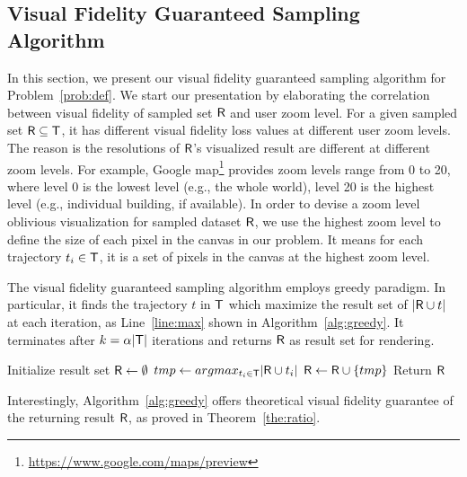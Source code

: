 \subsection{Visual Fidelity Guaranteed Sampling Algorithm}\label{sec:greedy}
In this section, we present our visual fidelity guaranteed sampling algorithm for Problem~\ref{prob:def}.
We start our presentation by elaborating the correlation between visual fidelity of sampled set $\mathsf{R}$ and user zoom level.
For a given sampled set $\mathsf{R} \subseteq \mathsf{T}$, it has different visual fidelity loss values at different user zoom levels.
The reason is the resolutions of $\mathsf{R}$'s visualized result are different at different zoom levels.
For example, Google map\footnote{\url{https://www.google.com/maps/preview}} provides zoom levels range from 0 to 20,
where level 0 is the lowest level (e.g., the whole world), level 20 is the highest level (e.g., individual building, if available).
In order to devise a zoom level oblivious visualization for sampled dataset $\mathsf{R}$,
we use the highest zoom level to define the size of each pixel in the canvas in our problem.
It means for each trajectory $t_i \in \mathsf{T}$, it is a set of pixels in the canvas at the highest zoom level.

The visual fidelity guaranteed sampling algorithm employs greedy paradigm.
In particular, it finds the trajectory $t$ in $\mathsf{T}$ which maximize the result set of $|\mathsf{R} \cup t|$ at each iteration, as Line~\ref{line:max} shown in Algorithm~\ref{alg:greedy}.
It terminates after $k=\alpha |\mathsf{T}|$ iterations and returns $\mathsf{R}$ as result set for rendering.

\begin{algorithm}
    \caption{$\vats(\D,k=\alpha |\D|)$} \label{alg:greedy}
    \begin{algorithmic}[1]
    \State Initialize result set $\mathsf{R} \leftarrow \emptyset$
        \State $tmp \leftarrow argmax_{t_i \in \mathsf{T}} |\mathsf{R} \cup t_i|$ \label{line:max}
        \State $\mathsf{R} \leftarrow \mathsf{R} \cup \{ tmp \}$
    \EndWhile
    \State Return $\mathsf{R}$
    \end{algorithmic}
\end{algorithm}

Interestingly, Algorithm~\ref{alg:greedy} offers theoretical visual fidelity guarantee of the returning result $\mathsf{R}$, as proved in Theorem~\ref{the:ratio}.

